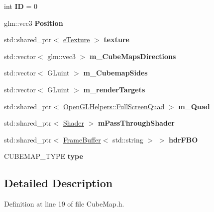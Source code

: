 \begin{DoxyCompactItemize}
\item 
int {\bfseries ID} = 0\hypertarget{class_cube_map_a6c8cb6843f7fac0f413750ab56a9672f}{}\label{class_cube_map_a6c8cb6843f7fac0f413750ab56a9672f}

\item 
glm\+::vec3 {\bfseries Position}\hypertarget{class_cube_map_a86c355799975449ea9021ff727c4b442}{}\label{class_cube_map_a86c355799975449ea9021ff727c4b442}

\item 
std\+::shared\+\_\+ptr$<$ \hyperlink{classe_texture}{e\+Texture} $>$ {\bfseries texture}\hypertarget{class_cube_map_a5abac1b20596767c00c1d265ca2cb2cc}{}\label{class_cube_map_a5abac1b20596767c00c1d265ca2cb2cc}

\item 
std\+::vector$<$ glm\+::vec3 $>$ {\bfseries m\+\_\+\+Cube\+Maps\+Directions}\hypertarget{class_cube_map_a6d5b3338b1c3f0f3cbf0f1b2862ca46d}{}\label{class_cube_map_a6d5b3338b1c3f0f3cbf0f1b2862ca46d}

\item 
std\+::vector$<$ G\+Luint $>$ {\bfseries m\+\_\+\+Cubemap\+Sides}\hypertarget{class_cube_map_a5c82161fb2912e10abe307259a7248f5}{}\label{class_cube_map_a5c82161fb2912e10abe307259a7248f5}

\item 
std\+::vector$<$ G\+Luint $>$ {\bfseries m\+\_\+render\+Targets}\hypertarget{class_cube_map_a4bc8ea4e83e9eed1e82f8a9320b50999}{}\label{class_cube_map_a4bc8ea4e83e9eed1e82f8a9320b50999}

\item 
std\+::shared\+\_\+ptr$<$ \hyperlink{class_open_g_l_helpers_1_1_full_screen_quad}{Open\+G\+L\+Helpers\+::\+Full\+Screen\+Quad} $>$ {\bfseries m\+\_\+\+Quad}\hypertarget{class_cube_map_a0723ffc8df92599c6445e315b3d5a390}{}\label{class_cube_map_a0723ffc8df92599c6445e315b3d5a390}

\item 
std\+::shared\+\_\+ptr$<$ \hyperlink{class_shader}{Shader} $>$ {\bfseries m\+Pass\+Through\+Shader}\hypertarget{class_cube_map_adc9413b47b2d588755ec28bb7bc20dc8}{}\label{class_cube_map_adc9413b47b2d588755ec28bb7bc20dc8}

\item 
std\+::shared\+\_\+ptr$<$ \hyperlink{class_frame_buffer}{Frame\+Buffer}$<$ std\+::string $>$ $>$ {\bfseries hdr\+F\+BO}\hypertarget{class_cube_map_ad759d8dd6c8832976d7389cd794a7e0a}{}\label{class_cube_map_ad759d8dd6c8832976d7389cd794a7e0a}

\item 
C\+U\+B\+E\+M\+A\+P\+\_\+\+T\+Y\+PE {\bfseries type}\hypertarget{class_cube_map_a5a58f0d7a0b0c706f2c432427603bf25}{}\label{class_cube_map_a5a58f0d7a0b0c706f2c432427603bf25}

\end{DoxyCompactItemize}


\subsection{Detailed Description}


Definition at line 19 of file Cube\+Map.\+h.

